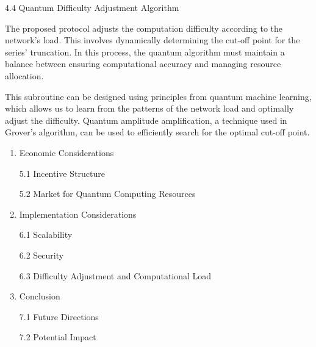 \documentclass[11pt]{article}
\begin{document}
4.4 Quantum Difficulty Adjustment Algorithm


The proposed protocol adjusts the computation difficulty according to the network's load. This involves dynamically determining the cut-off point for the series' truncation. In this process, the quantum algorithm must maintain a balance between ensuring computational accuracy and managing resource allocation.


This subroutine can be designed using principles from quantum machine learning, which allows us to learn from the patterns of the network load and optimally adjust the difficulty. Quantum amplitude amplification, a technique used in Grover's algorithm, can be used to efficiently search for the optimal cut-off point.

\begin{enumerate}
  \item Economic Considerations

5.1 Incentive Structure


5.2 Market for Quantum Computing Resources

  \item Implementation Considerations

6.1 Scalability


6.2 Security


6.3 Difficulty Adjustment and Computational Load

  \item Conclusion

7.1 Future Directions


7.2 Potential Impact

\end{enumerate}
\end{document}
